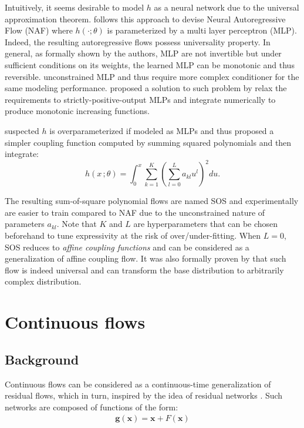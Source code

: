 Intuitively, it seems desirable to model $h$ as a neural network due to the
universal approximation theorem. \citep{huangNeuralAutoregressiveFlows2018}
follows this approach to devise Neural Autoregressive Flow (NAF) where $h(\cdot;
\theta)$ is parameterized by a multi layer perceptron (MLP). Indeed, the
resulting autoregressive flows possess universality property. In general, as
formally shown by the authors, MLP are not invertible but under sufficient
conditions on its weights, the learned MLP can be monotonic and thus reversible.
unconstrained MLP and thus require more complex conditioner for the same
modeling performance. \citep{wehenkelUnconstrainedMonotonicNeural2019} proposed a
solution to such problem by relax the requirements to strictly-positive-output
MLPs and integrate numerically to produce monotonic increasing functions.

\citep{jainiSumofSquaresPolynomialFlow2019} suspected
$h$ is overparameterized if modeled as MLPs and thus proposed a
simpler coupling function computed by summing squared polynomials and then integrate:
$$
h(x\,;\theta) =  \int_{0}^x \sum_{k=1}^K \left(\sum_{l=0}^L a_{kl}u^l \right)^2 du
.$$

The resulting sum-of-square polynomial flows are named SOS
\citep{jainiSumofSquaresPolynomialFlow2019} and experimentally are easier to
train compared to NAF due to the unconstrained nature of parameters $a_{kl}$.
Note that $K$ and $L$ are hyperparameters that can be chosen beforehand to tune
expressivity at the risk of over/under-fitting. When $L=0$, SOS reduces to
\textit{affine coupling functions} and can be considered as a generalization of
affine coupling flow. It was also formally proven by
\citep{jainiSumofSquaresPolynomialFlow2019} that such flow is indeed universal
and can transform the base distribution to arbitrarily complex distribution.

\section{Continuous flows}
\subsection{Background}
Continuous flows can be considered as a continuous-time generalization of
residual flows, which in turn, inspired by the idea of residual
networks \citep{heDeepResidualLearning2016}. Such networks are composed of functions of the form:
\begin{align}
\label{f:res}
\mathbf{g}(\mathbf{x}) = \mathbf{x} + F(\mathbf{x})
\end{align}

